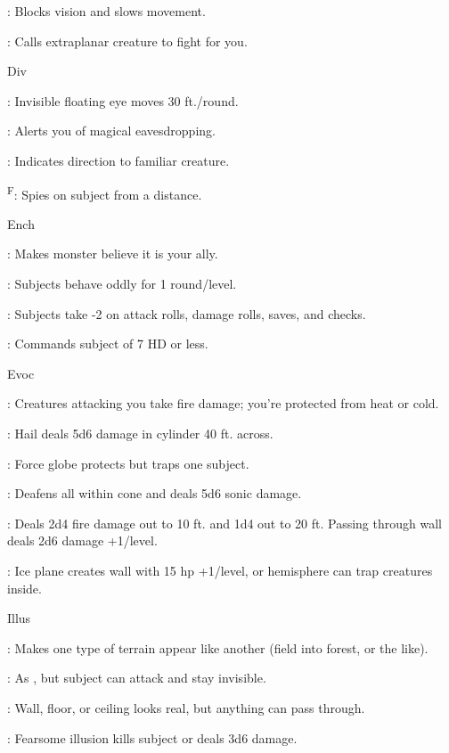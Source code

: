 : Blocks vision and slows movement.

: Calls extraplanar creature to fight for you.

Div

: Invisible floating eye moves 30 ft./round.

: Alerts you of magical eavesdropping.

: Indicates direction to familiar creature.

\textsuperscript{F}: Spies on subject from a distance.

Ench

: Makes monster believe it is your ally.

: Subjects behave oddly for 1 round/level.

: Subjects take -2 on attack rolls, damage rolls, saves, and checks.

: Commands subject of 7 HD or less.

Evoc

: Creatures attacking you take fire damage; you're protected from heat or cold.

: Hail deals 5d6 damage in cylinder 40 ft. across.

: Force globe protects but traps one subject.

: Deafens all within cone and deals 5d6 sonic damage.

: Deals 2d4 fire damage out to 10 ft. and 1d4 out to 20 ft. Passing through wall deals 2d6 damage +1/level.

: Ice plane creates wall with 15 hp +1/level, or hemisphere can trap creatures inside.

Illus

: Makes one type of terrain appear like another (field into forest, or the like).

: As , but subject can attack and stay invisible.

: Wall, floor, or ceiling looks real, but anything can pass through.

: Fearsome illusion kills subject or deals 3d6 damage.

